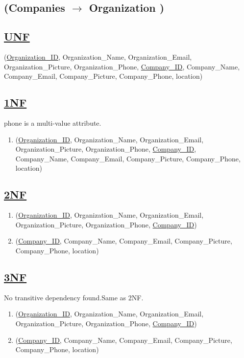 \subsection{\texorpdfstring{\centering (Companies $\rightarrow$ Organization )}{ (Companies - Organization )}}

\subsection*{\underline{UNF}}

(\underline{Organization\_ID}, Organization\_Name, Organization\_Email, Organization\_Picture, Organization\_Phone, \underline{Company\_ID}, Company\_Name, Company\_Email, Company\_Picture, Company\_Phone, location)

\subsection*{\underline{1NF}}
phone is a multi-value attribute.

\begin{enumerate}
    \item (\underline{Organization\_ID}, Organization\_Name, Organization\_Email, Organization\_Picture, Organization\_Phone, \underline{Company\_ID}, Company\_Name, Company\_Email, Company\_Picture, Company\_Phone, location)
\end{enumerate}

\subsection*{\underline{2NF}}
\begin{enumerate}
    \item (\underline{Organization\_ID}, Organization\_Name, Organization\_Email, Organization\_Picture, Organization\_Phone, \underline{Company\_ID})
    \item (\underline{Company\_ID}, Company\_Name, Company\_Email, Company\_Picture, Company\_Phone, location)
\end{enumerate}

\subsection*{\underline{3NF}}
No transitive dependency found.Same as 2NF.
\begin{enumerate}
    \item (\underline{Organization\_ID}, Organization\_Name, Organization\_Email, Organization\_Picture, Organization\_Phone, \underline{Company\_ID})
    \item (\underline{Company\_ID}, Company\_Name, Company\_Email, Company\_Picture, Company\_Phone, location)
\end{enumerate}

